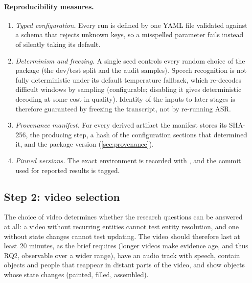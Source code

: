 \paragraph{Reproducibility measures.}
\begin{enumerate}[nosep]
  \item \emph{Typed configuration.} Every run is defined by one YAML file
        validated against a schema that rejects unknown keys, so a misspelled
        parameter fails instead of silently taking its default.
  \item \emph{Determinism and freezing.} A single seed controls every random
        choice of the package (the dev/test split and the audit samples).
        Speech recognition is not fully deterministic under its default
        temperature fallback, which re-decodes difficult windows by sampling
        (configurable; disabling it gives deterministic decoding at some cost
        in quality). Identity of the inputs to later stages is therefore
        guaranteed by freezing the transcript, not by re-running ASR.
  \item \emph{Provenance manifest.} For every derived artifact the manifest
        stores its SHA-256, the producing step, a hash of the configuration
        sections that determined it, and the package version
        (\cref{sec:provenance}).
  \item \emph{Pinned versions.} The exact environment is recorded with
        , and the commit used for reported results is tagged.
\end{enumerate}


\subsection{Step 2: video selection}\label{sec:selection}

The choice of video determines whether the research questions can be answered
at all: a video without recurring entities cannot test entity resolution, and
one without state changes cannot test updating. The video should therefore
last at least 20 minutes, as the brief requires (longer videos make evidence
age, and thus RQ2, observable over a wider range), have an audio track with
speech, contain objects and people that reappear in distant parts of the
video, and show objects whose state changes (painted, filled, assembled).

